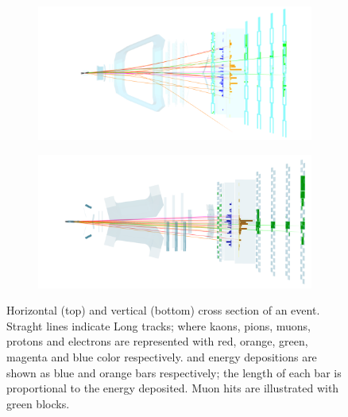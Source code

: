 \begin{figure}[t]
  \centering
  \begin{subfigure}{\textwidth}
    \includegraphics[width=\textwidth]{Figures/Chapter2/top}
    \label{det_evt_display_top}
  \end{subfigure}
  \begin{subfigure}{\textwidth}
    \includegraphics[width=\textwidth]{Figures/Chapter2/side}
    \label{det_evt_display_side}
  \end{subfigure}
  \caption{Horizontal (top) and vertical (bottom) cross section of an \lhcb event.
           Straght lines indicate Long tracks; where kaons, pions, muons, protons and electrons
           are represented with red, orange, green, magenta and blue color respectively. \ecal and \hcal energy depositions
           are shown as blue and orange bars respectively; the length of each bar is proportional to the energy deposited.
           Muon hits are illustrated with green blocks.}
  \label{det_evt_display}
\end{figure}

